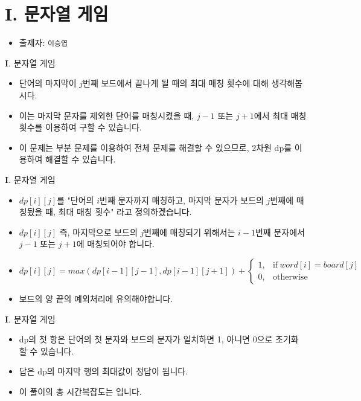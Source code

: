 \section{I. 문자열 게임}

\begin{frame} %
    \begin{itemize}
        \item 출제자: \texttt{이승엽}
    \end{itemize}
\end{frame}

\begin{frame}{\textbf{I}. 문자열 게임}
\begin{itemize}
	\item 단어의 마지막이 $j$번째 보드에서 끝나게 될 때의 최대 매칭 횟수에 대해 생각해봅시다.
	\item 이는 마지막 문자를 제외한 단어를 매칭시켰을 때, $j - 1$ 또는 $j + 1$에서 최대 매칭 횟수를 이용하여 구할 수 있습니다.
	\item 이 문제는 부분 문제를 이용하여 전체 문제를 해결할 수 있으므로, 2차원 dp를 이용하여 해결할 수 있습니다.
\end{itemize}
\end{frame}

\begin{frame}{\textbf{I}. 문자열 게임}
	\begin{itemize}
		\item $dp[i][j]$를 "단어의 $i$번째 문자까지 매칭하고, 마지막 문자가 보드의 $j$번째에 매칭됬을 때, 최대 매칭 횟수" 라고 정의하겠습니다.
		\item $dp[i][j]$ 즉, 마지막으로 보드의 $j$번째에 매칭되기 위해서는 $i - 1$번째 문자에서 $j - 1$ 또는 $j + 1$에 매칭되어야 합니다.
		\item $dp[i][j] = max(dp[i - 1][j - 1], dp[i - 1][j + 1]) + \begin{cases}
			1, & \text{if}\ word[i] = board[j] \\
			0, & \text{otherwise}
		\end{cases} $
		\item 보드의 양 끝의 예외처리에 유의해야합니다.
	\end{itemize}
\end{frame}

\begin{frame}{\textbf{I}. 문자열 게임}
	\begin{itemize}
		\item dp의 첫 항은 단어의 첫 문자와 보드의 문자가 일치하면 1, 아니면 0으로 초기화 할 수 있습니다.
		\item 답은 dp의 마지막 행의 최대값이 정답이 됩니다.
		\item 이 풀이의 총 시간복잡도는 입니다.
	\end{itemize}
\end{frame}